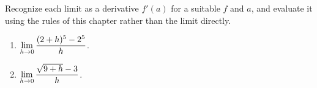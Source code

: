 \begin{exercise}
Recognize each limit as a derivative $f'(a)$ for a suitable $f$ and $a$, and evaluate it
using the rules of this chapter rather than the limit directly.
\begin{enumerate}
  \item $\displaystyle\lim_{h\to 0}\frac{(2+h)^5 - 2^5}{h}$.
  \item $\displaystyle\lim_{h\to 0}\frac{\sqrt{9+h} - 3}{h}$.
\end{enumerate}
\end{exercise}
